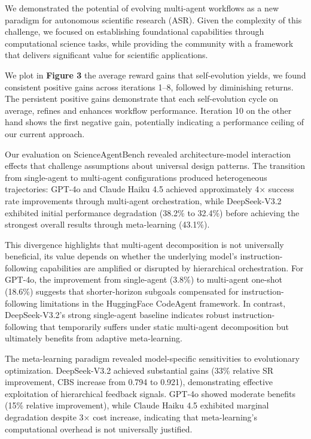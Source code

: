 \documentclass{article}
\begin{document}
We demonstrated the potential of evolving multi-agent workflows as a new paradigm for autonomous scientific research (ASR). Given the complexity of this challenge, we focused on establishing foundational capabilities through computational science tasks, while providing the community with a framework that delivers significant value for scientific applications.

We plot in \textbf{Figure 3} the average reward gains that self-evolution yields, we found consistent positive gains across iterations 1–8, followed by diminishing returns. The persistent positive gains demonstrate that each self-evolution cycle on average, refines and enhances workflow performance. Iteration 10 on the other hand shows the first negative gain, potentially indicating a performance ceiling of our current approach.

Our evaluation on ScienceAgentBench revealed architecture-model interaction effects that challenge assumptions about universal design patterns. The transition from single-agent to multi-agent configurations produced heterogeneous trajectories: GPT-4o and Claude Haiku 4.5 achieved approximately 4× success rate improvements through multi-agent orchestration, while DeepSeek-V3.2 exhibited initial performance degradation (38.2\% to 32.4\%) before achieving the strongest overall results through meta-learning (43.1\%).

This divergence highlights that multi-agent decomposition is not universally beneficial, its value depends on whether the underlying model's instruction-following capabilities are amplified or disrupted by hierarchical orchestration. For GPT-4o, the improvement from single-agent (3.8\%) to multi-agent one-shot (18.6\%) suggests that shorter-horizon subgoals compensated for instruction-following limitations in the HuggingFace CodeAgent framework. In contrast, DeepSeek-V3.2's strong single-agent baseline indicates robust instruction-following that temporarily suffers under static multi-agent decomposition but ultimately benefits from adaptive meta-learning.

The meta-learning paradigm revealed model-specific sensitivities to evolutionary optimization. DeepSeek-V3.2 achieved substantial gains (33\% relative SR improvement, CBS increase from 0.794 to 0.921), demonstrating effective exploitation of hierarchical feedback signals. GPT-4o showed moderate benefits (15\% relative improvement), while Claude Haiku 4.5 exhibited marginal degradation despite 3× cost increase, indicating that meta-learning's computational overhead is not universally justified.
\end{document}
